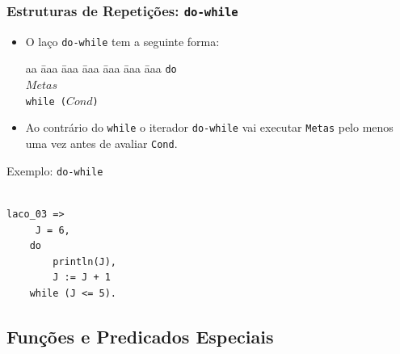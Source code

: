 \begin{frame}[fragile]
\frametitle{Estruturas de Repetições: \texttt{do-while}}

    \begin{itemize}
        
        \item O laço \texttt{do-while} tem a seguinte forma:
        
        \begin{tabbing}
            aa \= aaa \= aaa \= aaa \= aaa \= aaa \= aaa \kill
            \> \texttt{do} \\
            \> \> $Metas$  \\
            \>  \texttt{while ($Cond$)}
        \end{tabbing} 
        
        \item Ao contrário do  \texttt{while} o iterador \texttt{do-while}
        vai executar \texttt{Metas} pelo menos uma vez antes de avaliar \texttt{Cond}.
        
    \end{itemize}
    
\end{frame}


\begin{frame}[fragile]

\begin{block}{Exemplo: \texttt{do-while} }

\begin{lstlisting}[frame=single]
     
laco_03 =>  
     J = 6,  
    do  
        println(J),  
        J := J + 1  
    while (J <= 5).  
\end{lstlisting}
        
\end{block}
\end{frame}    



\subsection{Funções e Predicados Especiais}


